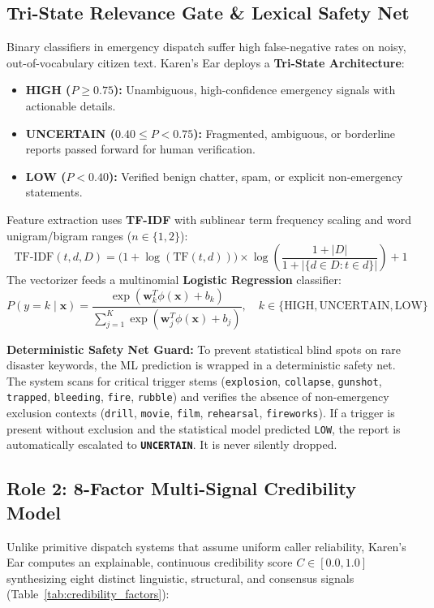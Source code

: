 \documentclass[10pt,a4paper]{article}
\begin{document}
\subsection{Tri-State Relevance Gate \& Lexical Safety Net}
Binary classifiers in emergency dispatch suffer high false-negative rates on noisy, out-of-vocabulary citizen text. Karen's Ear deploys a \textbf{Tri-State Architecture}:
\begin{itemize}
  \item \textbf{HIGH ($P \ge 0.75$):} Unambiguous, high-confidence emergency signals with actionable details.
  \item \textbf{UNCERTAIN ($0.40 \le P < 0.75$):} Fragmented, ambiguous, or borderline reports passed forward for human verification.
  \item \textbf{LOW ($P < 0.40$):} Verified benign chatter, spam, or explicit non-emergency statements.
\end{itemize}

Feature extraction uses \textbf{TF-IDF} with sublinear term frequency scaling and word unigram/bigram ranges ($n \in \{1, 2\}$):
\begin{equation}
  \text{TF-IDF}(t, d, D) = \big(1 + \log(\text{TF}(t, d))\big) \times \log\left(\frac{1 + |D|}{1 + |\{d \in D : t \in d\}|}\right) + 1
\end{equation}
The vectorizer feeds a multinomial \textbf{Logistic Regression} classifier:
\begin{equation}
  P(y = k \mid \mathbf{x}) = \frac{\exp(\mathbf{w}_k^T \phi(\mathbf{x}) + b_k)}{\sum_{j=1}^K \exp(\mathbf{w}_j^T \phi(\mathbf{x}) + b_j)}, \quad k \in \{\text{HIGH}, \text{UNCERTAIN}, \text{LOW}\}
\end{equation}

\textbf{Deterministic Safety Net Guard:} To prevent statistical blind spots on rare disaster keywords, the ML prediction is wrapped in a deterministic safety net. The system scans for critical trigger stems (\texttt{explosion}, \texttt{collapse}, \texttt{gunshot}, \texttt{trapped}, \texttt{bleeding}, \texttt{fire}, \texttt{rubble}) and verifies the absence of non-emergency exclusion contexts (\texttt{drill}, \texttt{movie}, \texttt{film}, \texttt{rehearsal}, \texttt{fireworks}). If a trigger is present without exclusion and the statistical model predicted \texttt{LOW}, the report is automatically escalated to \textbf{\texttt{UNCERTAIN}}. It is never silently dropped.

\subsection{Role 2: 8-Factor Multi-Signal Credibility Model}
Unlike primitive dispatch systems that assume uniform caller reliability, Karen's Ear computes an explainable, continuous credibility score $C \in [0.0, 1.0]$ synthesizing eight distinct linguistic, structural, and consensus signals (Table~\ref{tab:credibility_factors}):
\end{document}
